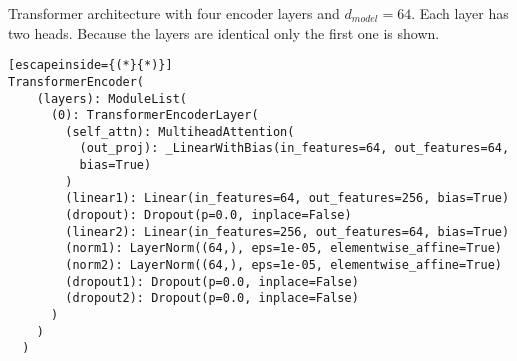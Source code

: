Transformer architecture with four encoder layers and $d_{model}=64$. Each layer has two heads. Because the layers are identical only the first one is shown.
\label{code:transformer}\begin{lstlisting}[escapeinside={(*}{*)}]
TransformerEncoder(
    (layers): ModuleList(
      (0): TransformerEncoderLayer(
        (self_attn): MultiheadAttention(
          (out_proj): _LinearWithBias(in_features=64, out_features=64, 
          bias=True)
        )
        (linear1): Linear(in_features=64, out_features=256, bias=True)
        (dropout): Dropout(p=0.0, inplace=False)
        (linear2): Linear(in_features=256, out_features=64, bias=True)
        (norm1): LayerNorm((64,), eps=1e-05, elementwise_affine=True)
        (norm2): LayerNorm((64,), eps=1e-05, elementwise_affine=True)
        (dropout1): Dropout(p=0.0, inplace=False)
        (dropout2): Dropout(p=0.0, inplace=False)
      )
    )
  )
\end{lstlisting}

